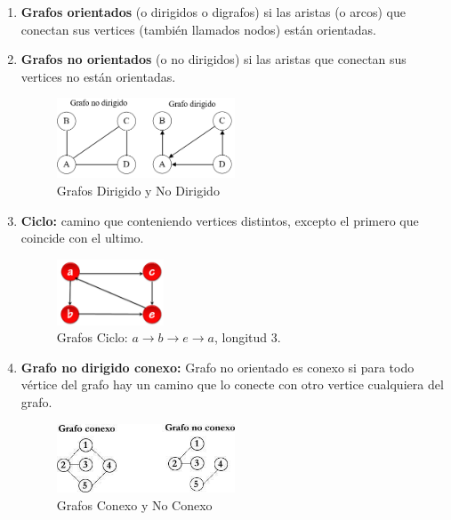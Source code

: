 \documentclass[../main.tex]{subfiles}
\begin{document}
    \begin{enumerate}
        \item \textbf{Grafos orientados} (o dirigidos o digrafos) si las aristas (o arcos) que conectan sus vertices
        (también llamados nodos) están orientadas.
        \item \textbf{Grafos no orientados} (o no dirigidos) si las aristas que conectan sus vertices no están
        orientadas.
            \begin{figure}[ht]
                \centering
                \includegraphics[width=0.5\textwidth]{images/grafos/grafos_dirigido.png}
                \caption{Grafos Dirigido y No Dirigido}      
            \end{figure}

        \item \textbf{Ciclo:} camino que conteniendo vertices distintos, excepto el primero que coincide con el ultimo.
            \begin{figure}[ht]
                \centering
                \includegraphics[width=0.3\textwidth]{images/grafos/grafo_ciclo.png}
                \caption{Grafos Ciclo: $a \rightarrow b \rightarrow e \rightarrow a$, longitud 3.}
                \label{fig:grafos_ciclo}     
            \end{figure}

        \item \textbf{Grafo no dirigido conexo:} Grafo no orientado es conexo si para todo vértice del grafo hay un camino que lo conecte con otro vertice cualquiera del grafo.
            \begin{figure}[ht]
                \centering
                \includegraphics[width=0.5\textwidth]{images/grafos/grafo_conexo.jpeg}
                \caption{Grafos Conexo y No Conexo}
            \end{figure}
        

\end{enumerate}
\end{document}
